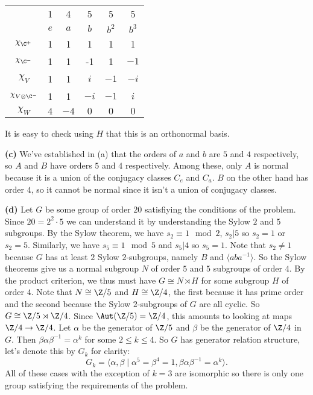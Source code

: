 \documentclass[11pt, letterpaper]{article}
\begin{document}
\begin{center}
    \begin{tabular}{c|c|c|c|c|c|}
        &1&4&5&5&5\\
        &$e$&$a$&$b$&$b^2$&$b^3$\\
        \hline
        $\chi_{\C^+}$&1&1&1&1&1\\
        $\chi_{\C^-}$&1&1&-1&1&$-1$\\
        $\chi_{V}$&1&1&$i$&$-1$&$-i$\\
        $\chi_{V\otimes \C^-}$&1&1&$-i$&$-1$&$i$\\
        $\chi_W$&$4$&$-4$&$0$&$0$&$0$\\
    \end{tabular}
\end{center}

It is easy to check using $H$ that this is an orthonormal basis.

\textbf{(c)} We've established in (a) that the orders of $a$ and $b$ are $5$ and $4$ respectively, so $A$ and $B$ have orders $5$ and $4$ respectively. Among these, only $A$ is normal because it is a union of the conjugacy classes $C_e$ and $C_a$. $B$ on the other hand has order $4$, so it cannot be normal since it isn't a union of conjugacy classes.

\textbf{(d)} Let $G$ be some group of order $20$ satisfiying the conditions of the problem. Since $20=2^2\cdot 5$ we can understand it by understanding the Sylow $2$ and $5$ subgroups. By the Sylow theorem, we have $s_2\equiv 1\mod 2$, $s_2|5$ so $s_2=1$ or $s_2=5$. Similarly, we have $s_5\equiv 1\mod 5$ and $s_5|4$ so $s_5=1$. Note that $s_2\neq 1$ because $G$ has at least $2$ Sylow $2$-subgroups, namely $B$ and $\langle aba^{-1}\rangle$. So the Sylow theorems give us a normal subgroup $N$ of order $5$ and $5$ subgroups of order $4$. By the product criterion, we thus must have $G\cong N\rtimes H$ for some subgroup $H$ of order $4$. Note that $N\cong \Z/5$ and $H\cong  \Z/4$, the first because it has prime order and the second because the Sylow $2$-subgroups of $G$ are all cyclic. So $G\cong \Z/5\rtimes \Z/4$. Since $\Aut(\Z/5)=\Z/4$, this amounts to looking at maps $\Z/4\to \Z/4$. Let $\alpha$ be the generator of $\Z/5$ and $\beta$ be the generator of $\Z/4$ in $G$. Then $\beta \alpha \beta^{-1}=\alpha^k$ for some $2\leq k \leq 4$. So $G$ has generator relation structure, let's denote this by $G_k$ for clarity:
\[
    G_k = \big\langle \alpha, \beta \mid \alpha^5=\beta^4=1, \beta\alpha\beta^{-1}=\alpha^k \big\rangle
.\] 
All of these cases with the exception of $k=3$ are isomorphic so there is only one group satisfying the requirements of the problem.
\end{document}
